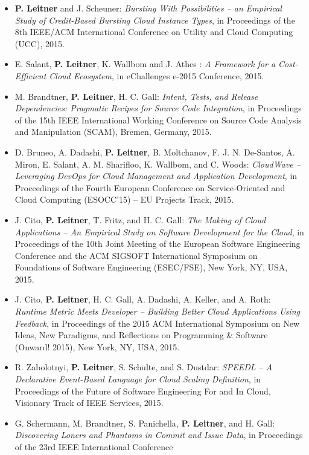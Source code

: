 \documentclass[paper=letter,fontsize=11pt]{scrartcl} %
\begin{document}
\begin{itemize}
	\item \textbf{P. Leitner} and J. Scheuner: \emph{Bursting With Possibilities -- an Empirical Study of Credit-Based Bursting Cloud Instance Types}, in Proceedings of the 8th IEEE/ACM International Conference on Utility and Cloud Computing (UCC), 2015. 
  \item E. Salant, \textbf{P. Leitner}, K. Wallbom and J. Athes : \emph{A Framework for a Cost-Efficient Cloud Ecosystem}, in eChallenges e-2015 Conference, 2015.
  \item M. Brandtner, \textbf{P. Leitner}, H. C. Gall: \emph{Intent, Tests, and Release Dependencies: Pragmatic Recipes for Source Code Integration}, in Proceedings of the 15th IEEE International Working Conference on Source Code Analysis and Manipulation (SCAM), Bremen, Germany, 2015. 
  \item  D. Bruneo, A. Dadashi, \textbf{P. Leitner}, B. Moltchanov, F. J. N. De-Santos, A. Miron, E. Salant, A. M. Sharifloo, K. Wallbom, and C. Woods: \emph{CloudWave – Leveraging DevOps for Cloud Management and Application Development}, in Proceedings of the Fourth European Conference on Service-Oriented and Cloud Computing (ESOCC’15) – EU Projects Track, 2015. 
      \item J. Cito, \textbf{P. Leitner}, T. Fritz, and H. C. Gall: \emph{The Making of Cloud Applications -- An Empirical Study on Software Development for the Cloud}, in Proceedings of the 10th Joint Meeting of the European Software Engineering Conference and the ACM SIGSOFT International Symposium on Foundations of Software Engineering (ESEC/FSE), New York, NY, USA, 2015. 
      \item J. Cito, \textbf{P. Leitner}, H. C. Gall, A. Dadashi, A. Keller, and A. Roth: \emph{Runtime Metric Meets Developer -- Building Better Cloud Applications Using Feedback}, in Proceedings of the 2015 ACM International Symposium on New Ideas, New Paradigms, and Reflections on Programming \& Software (Onward! 2015), New York, NY, USA, 2015. 
      \item R. Zabolotnyi, \textbf{P. Leitner}, S. Schulte, and S. Dustdar: \emph{SPEEDL -- A Declarative Event-Based Language for Cloud Scaling Definition}, in Proceedings of the Future of Software Engineering For and In Cloud, Visionary Track of IEEE Services, 2015. 
  \item G. Schermann, M. Brandtner, S. Panichella, \textbf{P. Leitner}, and H. Gall: \emph{Discovering Loners and Phantoms in Commit and Issue Data}, in Proceedings of the 23rd IEEE International Conference

\end{itemize}
\end{document}
